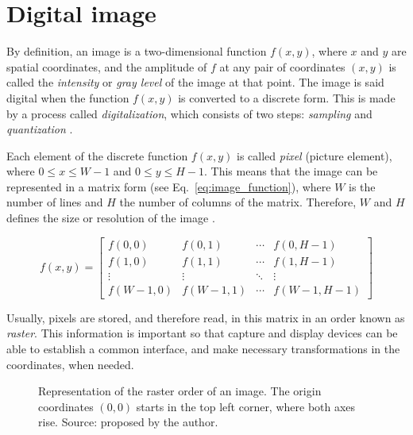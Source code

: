 \section{Digital image}
\label{sec:digital_image}
By definition, an image is a two-dimensional function $f(x, y)$, where $x$ and $y$ are spatial coordinates, and the amplitude of $f$ at any pair of coordinates $(x, y)$ is called the \textit{intensity} or \textit{gray level} of the image at that point. The image is said digital when the function $f(x, y)$ is converted to a discrete form. This is made by a process called \textit{digitalization}, which consists of two steps: \textit{sampling} and \textit{quantization} \citep{gonzalez:02}.

Each element of the discrete function $f(x, y)$ is called \textit{pixel} (picture element), where $0 \leq x \leq W - 1$ and $0 \leq y \leq H - 1$. This means that the image can be represented in a matrix form (see Eq.~\ref{eq:image_function}), where $W$ is the number of lines and $H$ the number of columns of the matrix. Therefore, $W$ and $H$ defines the size or resolution of the image \citep{pedrini:08}.

\begin{equation*}
f(x, y) =
 \begin{bmatrix}
  f(0, 0)     & f(0, 1)     & \cdots & f(0, H - 1) \\
  f(1, 0)     & f(1, 1)     & \cdots & f(1, H - 1) \\
  \vdots      & \vdots      & \ddots & \vdots  \\
  f(W - 1, 0) & f(W - 1, 1) & \cdots & f(W - 1, H - 1)
 \end{bmatrix}
\label{eq:image_function}
\end{equation*}

Usually, pixels are stored, and therefore read, in this matrix in an order known as \textit{raster}. This information is important so that capture and display devices can be able to establish a common interface, and make necessary transformations in the coordinates, when needed.

\begin{figure}[ht]
    \centering

    \caption[Representation of the raster order of an image]{Representation of the raster order of an image. The origin coordinates $(0, 0)$ starts in the top left corner, where both axes rise. Source: proposed by the author.}
    \label{fig:raster}
\end{figure}



